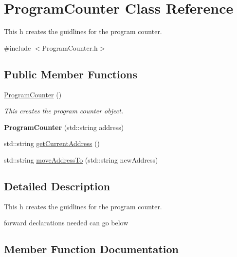 \hypertarget{class_program_counter}{}\section{Program\+Counter Class Reference}
\label{class_program_counter}


This h creates the guidlines for the program counter.  




{\ttfamily \#include $<$Program\+Counter.\+h$>$}

\subsection*{Public Member Functions}
\begin{DoxyCompactItemize}
\item 
\mbox{\label{class_program_counter_a63c70e470925203e4c15c861a7afca3a}} 
\mbox{\hyperlink{class_program_counter_a63c70e470925203e4c15c861a7afca3a}{Program\+Counter}} ()
\begin{DoxyCompactList}\small\item\em This creates the program counter object. \end{DoxyCompactList}\item 
\mbox{\label{class_program_counter_a80ea9c67bfdae62206491d69048ef36c}} 
{\bfseries Program\+Counter} (std\+::string address)
\item 
std\+::string \mbox{\hyperlink{class_program_counter_aaf3484382a00597d8548f5af9b56b881}{get\+Current\+Address}} ()
\item 
std\+::string \mbox{\hyperlink{class_program_counter_ac2587f6e388a7176d4e2dde5231924e0}{move\+Address\+To}} (std\+::string new\+Address)
\end{DoxyCompactItemize}


\subsection{Detailed Description}
This h creates the guidlines for the program counter. 

forward declarations needed can go below 

\subsection{Member Function Documentation}
\mbox{\label{class_program_counter_aaf3484382a00597d8548f5af9b56b881}} 
